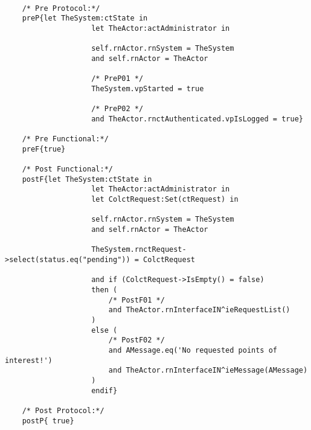 	\scriptsize
	\vspace{0.5cm}
	\begin{lstlisting}[style=MessirStyle,firstnumber=auto,captionpos=b,caption={\msrmessir (MCL-oriented) specification of the operation \emph{oeGetAllRequestsFromCoordinator}.},label=OM-actAdministrator-oeGetAllRequestsFromCoordinator-MCL-LST]

	/* Pre Protocol:*/ 
	preP{let TheSystem:ctState in
					let TheActor:actAdministrator in
					
					self.rnActor.rnSystem = TheSystem
					and self.rnActor = TheActor
					
					/* PreP01 */
					TheSystem.vpStarted = true
					
					/* PreP02 */
					and TheActor.rnctAuthenticated.vpIsLogged = true}
	
	/* Pre Functional:*/
	preF{true}
	
	/* Post Functional:*/ 
	postF{let TheSystem:ctState in
					let TheActor:actAdministrator in
					let ColctRequest:Set(ctRequest) in
					
					self.rnActor.rnSystem = TheSystem
					and self.rnActor = TheActor
					
					TheSystem.rnctRequest->select(status.eq("pending")) = ColctRequest
					
					and if (ColctRequest->IsEmpty() = false)
					then (
						/* PostF01 */
						and TheActor.rnInterfaceIN^ieRequestList()
					)
					else (
						/* PostF02 */
						and AMessage.eq('No requested points of interest!')
						and TheActor.rnInterfaceIN^ieMessage(AMessage)
					)
					endif}
	
	/* Post Protocol:*/ 
	postP{ true}
	
	\end{lstlisting}
	\normalsize 
	
	
	
	





